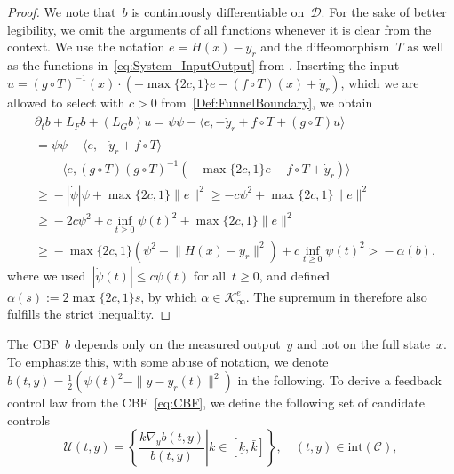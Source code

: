 \documentclass[journal,twoside,web]{ieeeconf}
\begin{document}
\begin{proof}
    We note that~$b$ is continuously differentiable on~$\mathcal{D}$.
    For the sake of better legibility, we omit the arguments of all functions whenever it is clear from the context. 
    We use the notation $e=H(x) -y_r$ and the diffeomorphism~$T$ as well as the functions in~\eqref{eq:System_InputOutput} from .
    Inserting the input $u=(g\circ T)^{-1}(x) \cdot (-\max\{2c,1\}e-(f\circ T)(x) +\dot y_r)$, which we are allowed to select with $c>0$ from~\eqref{Def:FunnelBoundary}, we obtain
    \begin{equation*}
        \begin{aligned}
            & \partial_t b 
            + L_Fb
            + (L_Gb)
            u 
            = \dot \psi \psi - \langle e, -\dot y_r + f\circ T + (g\circ T) u \rangle \\
            &=  \dot \psi \psi - \langle e, -\dot y_r + f\circ T \rangle \\
            & \quad - \langle e, (g\circ T)(g\circ T)^{-1}(-\max\{2c,1\}e-f\circ T+\dot y_r) \rangle \\
           & \ge \!- |\dot \psi| \psi + \max\{2c,1\}\|e\|^2 \ge - c\psi^2 + \max\{2c,1\}\|e\|^2 \\
           & \ge \!-2c\psi^2 + c \inf_{t\ge 0}\psi(t)^2 + \max\{2c,1\}\|e\|^2 \\
           & \ge \!-\!\max\{2c,1\} (\psi^2 \!-\! \| H(x)\!-\!y_r\|^2) \!+\! c\inf_{t\ge 0}\psi(t)^2 > \!- \alpha(b), 
        \end{aligned}
    \end{equation*}
    where we used~$|\dot \psi(t)| \le c \psi(t)$ for all~$t \ge 0$, and defined $\alpha(s) := 2\max\{2c,1\} s$, by which $\alpha\in\mathcal{K}_\infty^e$. 
    The supremum in  therefore also fulfills the strict inequality.
\end{proof}
The CBF~$b$ depends only on the measured output~$y$ and not on the full state~$x$. To emphasize this, with some abuse of notation,  we denote $b(t,y)=\tfrac{1}{2}\left(\psi(t)^2-\|y-y_r(t)\|^2\right)$ in the following. 
%
To derive a feedback control law from the CBF~\eqref{eq:CBF}, we define the following set of candidate controls
\begin{equation} \label{eq:u_FC_from_b}
        \mathcal{U}(t,y)= \left\{ \left.  \! \frac{k \nabla_y b(t,y)}{b(t,y)}  \right| k \in[\underline{k},\bar k] \right\}, \quad (t,y) \in \text{int}(\mathcal{C}),
\end{equation}
\end{document}

